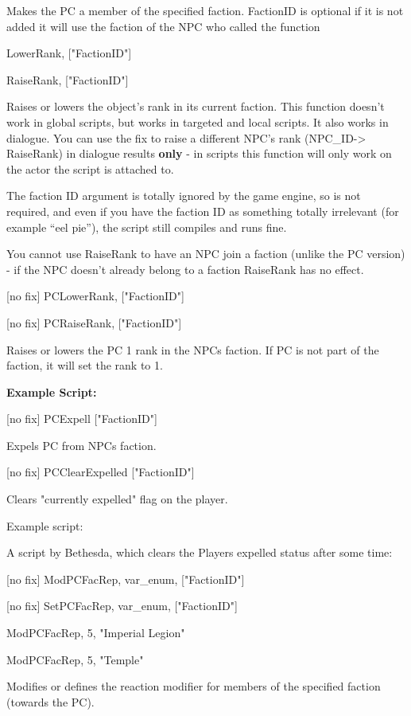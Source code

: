 Makes the PC a member of the specified faction. FactionID is optional if
it is not added it will use the faction of the NPC who called the
function

LowerRank, {[}"FactionID"{]}

RaiseRank, {[}"FactionID"{]}

Raises or lowers the object's rank in its current faction. This function
doesn't work in global scripts, but works in targeted and local scripts.
It also works in dialogue. You can use the fix to raise a different
NPC's rank (NPC\_ID-> RaiseRank) in dialogue results
\textbf{only} - in scripts this function will only work on the actor the
script is attached to.

The faction ID argument is totally ignored by the game engine, so is not
required, and even if you have the faction ID as something totally
irrelevant (for example ``eel pie''), the script still compiles and runs
fine.

You cannot use RaiseRank to have an NPC join a faction (unlike the PC
version) - if the NPC doesn't already belong to a faction RaiseRank has
no effect.

{[}no fix{]} PCLowerRank, {[}"FactionID"{]}

{[}no fix{]} PCRaiseRank, {[}"FactionID"{]}

Raises or lowers the PC 1 rank in the NPCs faction. If PC is not part of
the faction, it will set the rank to 1.

\textbf{Example Script:}



{[}no fix{]} PCExpell {[}"FactionID"{]}

Expels PC from NPCs faction.

{[}no fix{]} PCClearExpelled {[}"FactionID"{]}

Clears "currently expelled" flag on the player.

Example script:

A script by Bethesda, which clears the Players expelled status after
some time:



{[}no fix{]} ModPCFacRep, var\_enum, {[}"FactionID"{]}

{[}no fix{]} SetPCFacRep, var\_enum, {[}"FactionID"{]}

ModPCFacRep, 5, "Imperial Legion"

ModPCFacRep, 5, "Temple"

Modifies or defines the reaction modifier for members of the specified
faction (towards the PC).

